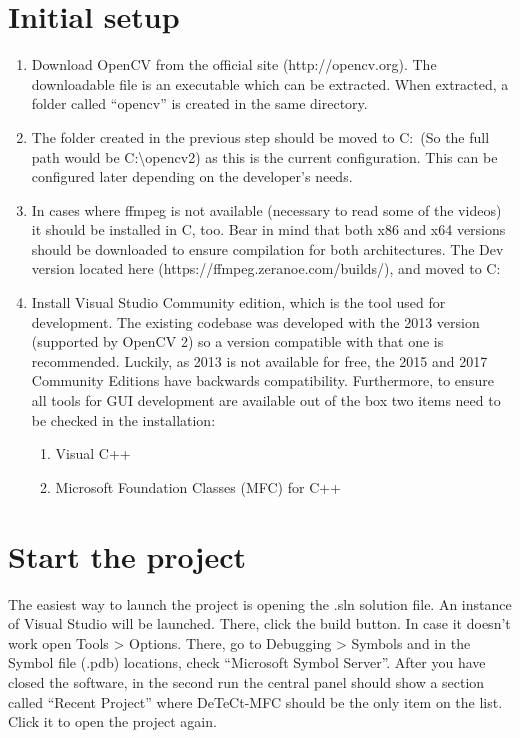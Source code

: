 \documentclass[a4paper,11pt]{memoir}
\begin{document}
\section{Initial setup}
\begin{enumerate}
\item Download OpenCV from the official site (http://opencv.org). The downloadable file is an executable which can be extracted. When extracted, a folder called “opencv” is created in the same directory.
\item The folder created in the previous step should be moved to C:\ (So the full path would be C:\textbackslash{}opencv2) as this is the current configuration. This can be configured later depending on the developer’s needs.
\item In cases where ffmpeg is not available (necessary to read some of the videos) it should be installed in C, too. Bear in mind that both x86 and x64 versions should be downloaded to ensure compilation for both architectures. The Dev version located here (https://ffmpeg.zeranoe.com/builds/), and moved to C:
\item Install Visual Studio Community edition, which is the tool used for development. The existing codebase was developed with the 2013 version (supported by OpenCV 2) so a version compatible with that one is recommended. Luckily, as 2013 is not available for free, the 2015 and 2017 Community Editions have backwards compatibility. Furthermore, to ensure all tools for GUI development are available out of the box two items need to be checked in the installation:
\begin{enumerate}
\item Visual C++
\item Microsoft Foundation Classes (MFC) for C++
\end{enumerate}
\end{enumerate}


\section{Start the project}

The easiest way to launch the project is opening the .sln solution file. An instance of Visual Studio will be launched. There, click the build button. In case it doesn’t work open Tools > Options. There, go to Debugging > Symbols and in the Symbol file (.pdb) locations, check “Microsoft Symbol Server”. After you have closed the software, in the second run the central panel should show a section called “Recent Project” where DeTeCt-MFC should be the only item on the list. Click it to open the project again.
\end{document}
